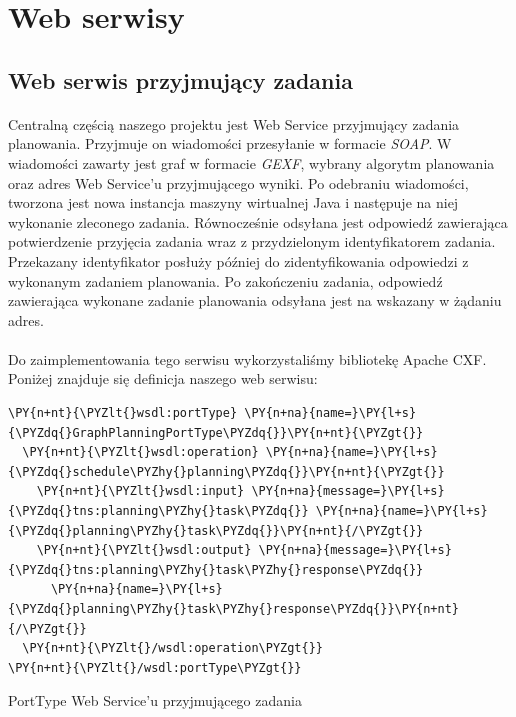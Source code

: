 \section{Web serwisy}
\label{sec:webservices}

\subsection{Web serwis przyjmujący zadania}
\paragraph{}
Centralną częścią naszego projektu jest Web Service przyjmujący zadania planowania. 
Przyjmuje on wiadomości przesyłanie w formacie {\it SOAP}.
W wiadomości zawarty jest graf w formacie {\it GEXF}, wybrany algorytm planowania oraz adres Web Service'u przyjmującego wyniki.
Po odebraniu wiadomości, tworzona jest nowa instancja maszyny wirtualnej Java i następuje na niej wykonanie zleconego zadania.
Równocześnie odsyłana jest odpowiedź zawierająca potwierdzenie przyjęcia zadania wraz z przydzielonym identyfikatorem zadania.
Przekazany identyfikator posłuży później do zidentyfikowania odpowiedzi z wykonanym zadaniem planowania.
Po zakończeniu zadania, odpowiedź zawierająca wykonane zadanie planowania odsyłana jest na wskazany w żądaniu adres.

\paragraph{}
Do zaimplementowania tego serwisu wykorzystaliśmy bibliotekę Apache CXF.
Poniżej znajduje się definicja naszego web serwisu:

\begin{program}
\begin{code}
\begin{Verbatim}[commandchars=\\\{\}]
\PY{n+nt}{\PYZlt{}wsdl:portType} \PY{n+na}{name=}\PY{l+s}{\PYZdq{}GraphPlanningPortType\PYZdq{}}\PY{n+nt}{\PYZgt{}}
  \PY{n+nt}{\PYZlt{}wsdl:operation} \PY{n+na}{name=}\PY{l+s}{\PYZdq{}schedule\PYZhy{}planning\PYZdq{}}\PY{n+nt}{\PYZgt{}}
    \PY{n+nt}{\PYZlt{}wsdl:input} \PY{n+na}{message=}\PY{l+s}{\PYZdq{}tns:planning\PYZhy{}task\PYZdq{}} \PY{n+na}{name=}\PY{l+s}{\PYZdq{}planning\PYZhy{}task\PYZdq{}}\PY{n+nt}{/\PYZgt{}}
    \PY{n+nt}{\PYZlt{}wsdl:output} \PY{n+na}{message=}\PY{l+s}{\PYZdq{}tns:planning\PYZhy{}task\PYZhy{}response\PYZdq{}} 
      \PY{n+na}{name=}\PY{l+s}{\PYZdq{}planning\PYZhy{}task\PYZhy{}response\PYZdq{}}\PY{n+nt}{/\PYZgt{}}
  \PY{n+nt}{\PYZlt{}/wsdl:operation\PYZgt{}}
\PY{n+nt}{\PYZlt{}/wsdl:portType\PYZgt{}}
\end{Verbatim}
\end{code}
\caption{PortType Web Service'u przyjmującego zadania}
\end{program}

